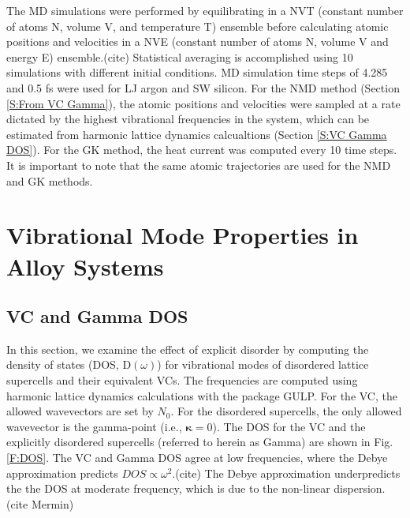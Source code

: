 \documentclass[aps,prb,onecolumn,preprint,superscriptaddress,amsmath,amssymb,floatfix]{revtex4}
\begin{document}
The MD simulations were performed by equilibrating in a NVT (constant 
number of atoms N, volume V, and temperature T) ensemble before 
calculating atomic positions and velocities in a NVE 
(constant number of 
atoms N, volume V and energy E) ensemble.(cite)  
Statistical averaging is accomplished 
using 10 simulations with different initial conditions. MD simulation 
time steps of 
4.285 and 0.5 fs were used for LJ argon and SW silicon. 
For the NMD method (Section \ref{S:From VC Gamma}), 
the atomic positions 
and velocities were sampled at a rate dictated by the highest vibrational 
frequencies in the system, which can be estimated from harmonic lattice 
dynamics calcualtions (Section \ref{S:VC Gamma DOS}). 
For the GK method, the heat current 
was computed every 10 time steps. It is important to note that the same 
atomic trajectories are used for the NMD and GK methods. 

\section{\label{S:Vibrational}
Vibrational Mode Properties in Alloy Systems}

\subsection{\label{S:VC Gamma DOS}VC and Gamma DOS}

In this section, we examine the effect of explicit disorder by computing 
the density of states (DOS, D$(\omega)$) for vibrational modes of  
disordered lattice supercells and their 
equivalent VCs. The frequencies 
are computed using harmonic lattice dynamics calculations with the package 
GULP.\cite{gale_general_2003} For the 
VC, the allowed wavevectors are set by $N_0$. For the disordered 
supercells,
the only allowed wavevector is the gamma-point (i.e., $\pmb{\kappa}=0$). 
The DOS for the VC and the explicitly disordered supercells 
(referred to herein as Gamma) are shown in Fig. \ref{F:DOS}. 
The VC and Gamma DOS 
agree at low frequencies, where the Debye approximation predicts 
$DOS \propto \omega^2$.(cite) The Debye approximation 
underpredicts the the DOS at moderate frequency, which is due to the 
non-linear dispersion.(cite Mermin)
\end{document}
